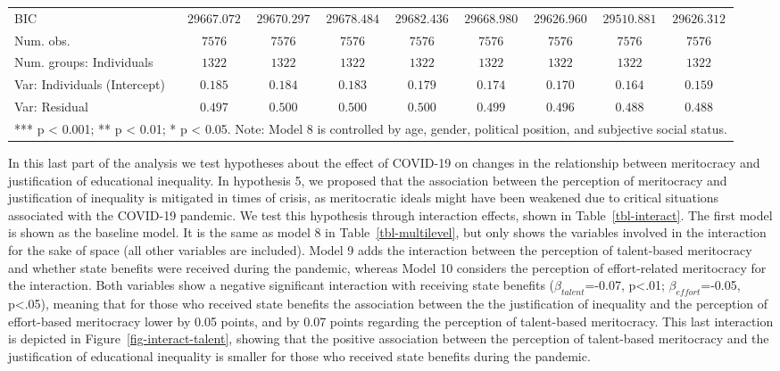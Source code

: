 \documentclass[
  12pt,
  10pt]{article}
\begin{document}
\begin{table}
{\begin{center}
{\begin{tabular}{l c c c c c c c c}
BIC                                         & $29667.072$    & $29670.297$    & $29678.484$    & $29682.436$    & $29668.980$    & $29626.960$    & $29510.881$    & $29626.312$    \\
Num. obs.                                   & $7576$         & $7576$         & $7576$         & $7576$         & $7576$         & $7576$         & $7576$         & $7576$         \\
Num. groups: Individuals                    & $1322$         & $1322$         & $1322$         & $1322$         & $1322$         & $1322$         & $1322$         & $1322$         \\
Var: Individuals (Intercept)                & $0.185$        & $0.184$        & $0.183$        & $0.179$        & $0.174$        & $0.170$        & $0.164$        & $0.159$        \\
Var: Residual                               & $0.497$        & $0.500$        & $0.500$        & $0.500$        & $0.499$        & $0.496$        & $0.488$        & $0.488$        \\
\hline
\multicolumn{9}{l}{\scriptsize{*** p < 0.001; ** p < 0.01; * p < 0.05.
Note: Model 8 is controlled by age, gender, political position, and subjective social status.}}
\end{tabular}
}
\label{table:coefficients}
\end{center}

}

\end{table}%

In this last part of the analysis we test hypotheses about the effect of
COVID-19 on changes in the relationship between meritocracy and
justification of educational inequality. In hypothesis 5, we proposed
that the association between the perception of meritocracy and
justification of inequality is mitigated in times of crisis, as
meritocratic ideals might have been weakened due to critical situations
associated with the COVID-19 pandemic. We test this hypothesis through
interaction effects, shown in Table~\ref{tbl-interact}. The first model
is shown as the baseline model. It is the same as model 8 in
Table~\ref{tbl-multilevel}, but only shows the variables involved in the
interaction for the sake of space (all other variables are included).
Model 9 adds the interaction between the perception of talent-based
meritocracy and whether state benefits were received during the
pandemic, whereas Model 10 considers the perception of effort-related
meritocracy for the interaction. Both variables show a negative
significant interaction with receiving state benefits
(\(\beta_{talent}\)=-0.07, p\textless.01; \(\beta_{effort}\)=-0.05,
p\textless.05), meaning that for those who received state benefits the
association between the the justification of inequality and the
perception of effort-based meritocracy lower by 0.05 points, and by 0.07
points regarding the perception of talent-based meritocracy. This last
interaction is depicted in Figure~\ref{fig-interact-talent}, showing
that the positive association between the perception of talent-based
meritocracy and the justification of educational inequality is smaller
for those who received state benefits during the pandemic.
\end{document}
